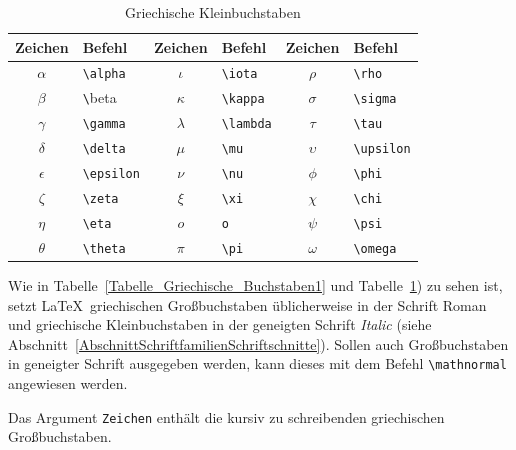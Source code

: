 \documentclass[a4paper,10pt,twoside]{scrbook}
\begin{document}
{\begin{table}[h!tb]
\centering
\caption{Griechische Kleinbuchstaben}
\label{Tabelle_Griechische_Buchstaben2}       %
\begin{tabular}{clclcl}
\hline
Zeichen & Befehl & Zeichen & Befehl & Zeichen & Befehl \\
\hline
\(\alpha\) & \texttt{\textbackslash alpha} & 
\(\iota\) & \texttt{\textbackslash iota} &
\(\rho\) & \texttt{\textbackslash rho}\\
\(\beta\) & {\texttt \textbackslash beta} &
\(\kappa\) & \texttt{\textbackslash kappa} &
\(\sigma\) & \texttt{\textbackslash sigma}\\
\(\gamma\) & \texttt{\textbackslash gamma} & 
\(\lambda\) & \texttt{\textbackslash lambda} &
\(\tau\) & \texttt{\textbackslash tau} \\
\(\delta\) & \texttt{\textbackslash delta} &
\(\mu\) & \texttt{\textbackslash mu} &
\(\upsilon\) & \texttt{\textbackslash upsilon} \\
\(\epsilon\) & \texttt{\textbackslash epsilon} & 
\(\nu\) & \texttt{\textbackslash nu} &
\(\phi\) & \texttt{\textbackslash phi} \\
\(\zeta\) & \texttt{\textbackslash zeta} & 
\(\xi\) & \texttt{\textbackslash xi} &
\(\chi\) & \texttt{\textbackslash chi}\\
\(\eta\) & \texttt{\textbackslash eta} & 
\(o\) & \texttt{o} &
\(\psi\) & \texttt{\textbackslash psi} \\
\(\theta\) & \texttt{\textbackslash theta} & 
\(\pi\) & \texttt{\textbackslash pi} &
\(\omega\) & \texttt{\textbackslash omega} \\
\hline
\end{tabular}
\end{table}

Wie in Tabelle~\ref{Tabelle_Griechische_Buchstaben1} und Tabelle~\ref{Tabelle_Griechische_Buchstaben2}) zu sehen ist, 
setzt \LaTeX\ griechischen Großbuchstaben üblicherweise in der Schrift Roman und griechische Kleinbuchstaben in der geneigten Schrift \textit{Italic} (siehe Abschnitt~\ref{AbschnittSchriftfamilienSchriftschnitte}).
Sollen auch Großbuchstaben in geneigter Schrift ausgegeben werden, kann dieses mit dem Befehl 
\verb!\mathnormal! angewiesen werden.


Das Argument \verb!Zeichen! enthält die
kursiv zu schreibenden griechischen Großbuchstaben.

}
\end{document}
